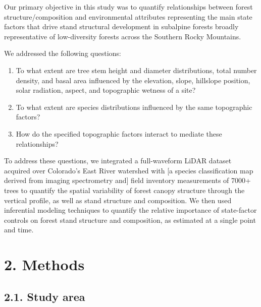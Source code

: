 \documentclass[
  12pt,
]{article}
\providecommand{\tightlist}{%
  \setlength{\itemsep}{0pt}\setlength{\parskip}{0pt}}
\begin{document}
Our primary objective in this study was to quantify relationships
between forest structure/composition and environmental attributes
representing the main state factors that drive stand structural
development in subalpine forests broadly representative of low-diversity
forests across the Southern Rocky Mountains.

We addressed the following questions:

\begin{enumerate}
\def\labelenumi{\arabic{enumi}.}
\tightlist
\item
  To what extent are tree stem height and diameter distributions, total
  number density, and basal area influenced by the elevation, slope,
  hillslope position, solar radiation, aspect, and topographic wetness
  of a site?
\item
  To what extent are species distributions influenced by the same
  topographic factors?
\item
  How do the specified topographic factors interact to mediate these
  relationships?
\end{enumerate}

To address these questions, we integrated a full-waveform LiDAR dataset
acquired over Colorado's East River watershed with {[}a species
classification map derived from imaging spectrometry and{]} field
inventory measurements of 7000+ trees to quantify the spatial
variability of forest canopy structure through the vertical profile, as
well as stand structure and composition. We then used inferential
modeling techniques to quantify the relative importance of state-factor
controls on forest stand structure and composition, as estimated at a
single point and time.

\section{2. Methods}\label{methods}

\subsection{2.1. Study area}\label{study-area}
\end{document}
